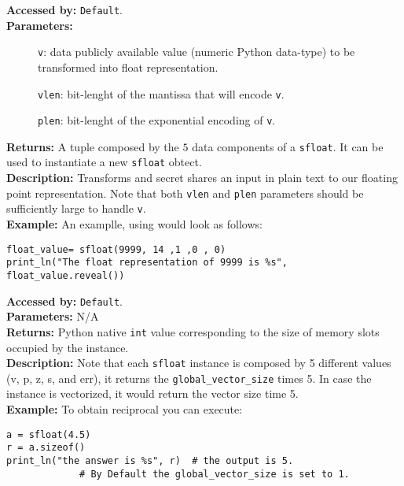 		      \textbf{Accessed by:} \verb|Default|. \\
		      \textbf{Parameters:}
		      \begin{description}
			     \item[]\verb|v|: data publicly available value (numeric Python data-type) to be transformed into float representation.
			     \item[]\verb|vlen|: bit-lenght of the mantissa that will encode \verb|v|.
			     \item[]\verb|plen|: bit-lenght of the exponential encoding of \verb|v|.
		      \end{description}
		      \textbf{Returns:} A tuple composed by the $5$ data components of a \verb|sfloat|. 
		      It can be used to instantiate a new \verb|sfloat| obtect.\\
		      \textbf{Description:} Transforms and secret shares an input 
		      in plain text to our floating point representation. 
		      Note that both \verb|vlen| and \verb|plen| parameters should 
		      be sufficiently large to handle \verb|v|.\\
		\textbf{Example:}
		An examplle, using  would look as follows:
\begin{lstlisting}
float_value= sfloat(9999, 14 ,1 ,0 , 0) 
print_ln("The float representation of 9999 is %s", float_value.reveal())		
\end{lstlisting}
                        \textbf{Accessed by:} \verb|Default|. \\
                        \textbf{Parameters:} N/A \\
                        \textbf{Returns:}
                                 Python native \verb|int| value corresponding to the size of 
                                 memory slots occupied by the instance. \\
                        \textbf{Description:}
                                Note that each \verb|sfloat| instance is composed by 5 
                                different values (v, p, z, s, and err), 
                                it returns the \verb|global_vector_size| times 5. 
                                In case the instance is vectorized, 
                                it would return the vector size time 5.\\
                \textbf{Example:}
                    To obtain reciprocal you can execute:
\begin{lstlisting}
a = sfloat(4.5)
r = a.sizeof()
print_ln("the answer is %s", r)  # the output is 5. 
			 # By Default the global_vector_size is set to 1.
\end{lstlisting}
                        
